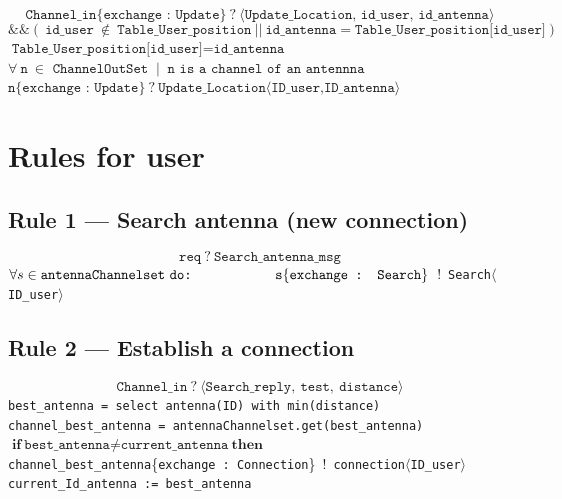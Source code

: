 \documentclass[a4paper,11pt]{article}
\begin{document}
\[
\texttt{Channel\_in}\{\texttt{exchange : Update}\}\ ?\ \langle\texttt{Update\_Location, id\_user, id\_antenna}\rangle
\]
\[
\&\&(\ \texttt{id\_user}\ \notin\ \texttt{Table\_User\_position}\ ||\ \texttt{id\_antenna} = \texttt{Table\_User\_position[id\_user]})
\]
\hspace*{3em}$\texttt{Table\_User\_position[id\_user]} = \texttt{id\_antenna}$\\
 \hspace*{3em}$\forall\ \texttt{n}\ \in \texttt{ ChannelOutSet }\ |\ \texttt{ n is a channel of an antennna} $\\
\hspace*{6em}$\texttt{n}\{\texttt{exchange : Update}\}\ ?\ \texttt{Update\_Location}\langle\texttt{ID\_user,ID\_antenna}\rangle $

\section*{Rules for user}

\subsection*{Rule 1 — Search antenna (new connection)}

\[
\texttt{req}\ ?\ \texttt{Search\_antenna\_msg}
\]
\hspace*{3em}$\forall s \in \texttt{antennaChannelset}\ \texttt{do:}\\
\hspace*{6em}\texttt{s}\{\texttt{exchange : Search}\}$\ !\ \texttt{Search}$\langle$\texttt{ID\_user}$\rangle$

\subsection*{Rule 2 — Establish a connection}

\[
\texttt{Channel\_in}\ ?\ \langle\texttt{Search\_reply},\ \texttt{test},\ \texttt{distance}\rangle
\]
\hspace*{3em}\texttt{best\_antenna = select antenna(ID) with min(distance)}\\
\hspace*{3em}\texttt{channel\_best\_antenna = antennaChannelset.get(best\_antenna)}\\
\hspace*{3em}$\textbf{if}\ \texttt{best\_antenna} \neq \texttt{current\_antenna}\ \textbf{then}$\\
\hspace*{6em}\texttt{channel\_best\_antenna}\{\texttt{exchange : Connection}\}\ !\ \texttt{connection}$\langle$\texttt{ID\_user}$\rangle$\\
\hspace*{6em}\texttt{current\_Id\_antenna := best\_antenna}
\end{document}
